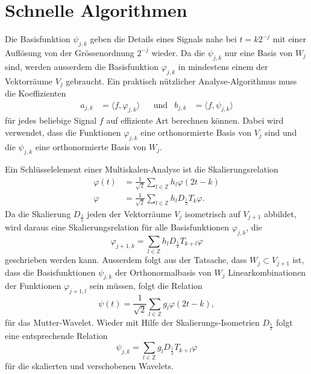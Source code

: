 %
%
%
\section{Schnelle Algorithmen
\label{section:fast}}
Die Basisfunktion $\psi_{j,k}$ geben die Details eines Signals nahe bei $t=k2^{-j}$ 
mit einer Auflösung von der Grössenordnung $2^{-j}$ wieder.
Da die $\psi_{j,k}$ nur eine Basis von $W_j$ sind, werden ausserdem die
Basisfunktion $\varphi_{j,k}$ in mindestens einem der Vektorräume
$V_j$ gebraucht.
Ein praktisch nützlicher Analyse-Algorithmus muss die Koeffizienten
\[
\begin{aligned}
a_{j,k} &= \langle f, \varphi_{j,k}\rangle
&&\text{und}&
b_{j,k} &= \langle f, \psi_{j,k}\rangle
\end{aligned}
\]
für jedes beliebige Signal $f$ auf effiziente Art berechnen können.
Dabei wird verwendet, dass die Funktionen  $\varphi_{j,k}$ eine
orthonormierte Basis von $V_j$ sind und die $\psi_{j,k}$ eine
orthonormierte Basis von $W_j$.

Ein Schlüsselelement einer Multiskalen-Analyse ist die Skalierungsrelation
\begin{align*}
\varphi(t) &= \frac{1}{\sqrt{2}} \sum_{l\in\mathbb Z} h_l \varphi(2t-k)
\\
\varphi    &= \frac{1}{\sqrt{2}} \sum_{l\in\mathbb Z} h_l D_{\frac12}T_k\varphi.
\end{align*}
Da die Skalierung $D_{\frac12}$ jeden der Vektorräume $V_j$ isometrisch auf $V_{j+1}$
abbildet, wird daraus eine Skalierungsrelation für alle Basisfunktionen $\varphi_{j,k}$,
die
\begin{equation}
\varphi_{j+1,k}
=
\sum_{l\in\mathbb Z} h_l D_{\frac12}T_{k+l}\varphi
\label{fast:phirelation}
\end{equation}
geschrieben werden kann.
Ausserdem folgt aus der Tatsache, dass $W_j\subset V_{j+1}$ ist, dass die Basisfunktionen
$\psi_{j,k}$ der Orthonormalbasis von $W_j$ Linearkombinationen der Funktionen
$\varphi_{j+1,l}$ sein müssen, folgt die Relation
\[
\psi(t) = \frac{1}{\sqrt{2}}\sum_{l\in\mathbb Z} g_l \varphi(2t-k),
\]
für das Mutter-Wavelet.
Wieder mit Hilfe der Skalierungs-Isometrien $D_{\frac12}$ folgt eine entsprechende
Relation
\begin{equation}
\psi_{j,k}
=
\sum_{l\in\mathbb Z} g_l D_{\frac12}T_{k+l}\varphi
\label{fast:psirelation}
\end{equation}
für die skalierten und verschobenen Wavelets.

